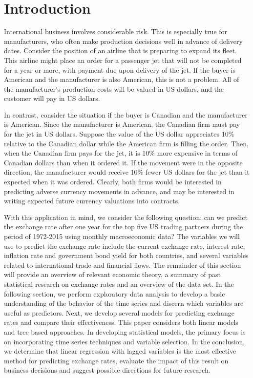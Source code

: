 \documentclass{sig-alternate-05-2015}
\begin{document}
\section{Introduction}
International business involves considerable risk. This is especially true for manufacturers, who often make production decisions well in advance of delivery dates. Consider the position of an airline that is preparing to expand its fleet. This airline might place an order for a passenger jet that will not be completed for a year or more, with payment due upon delivery of the jet. If the buyer is American and the manufacturer is also American, this is not a problem. All of the manufacturer's production costs will be valued in US dollars, and the customer will pay in US dollars.
\par{} In contrast, consider the situation if the buyer is Canadian and the manufacturer is American. Since the manufacturer is American, the Canadian firm must pay for the jet in US dollars. Suppose the value of the US dollar appreciates 10\% relative to the Canadian dollar while the American firm is filling the order. Then, when the Canadian firm pays for the jet, it is 10\% more expensive in terms of Canadian dollars than when it ordered it. If the movement were in the opposite direction, the manufacturer would receive 10\% fewer US dollars for the jet than it expected when it was ordered. Clearly, both firms would be interested in predicting adverse currency movements in advance, and may be interested in writing expected future currency valuations into contracts. 
\par{} With this application in mind, we consider the following question: can we predict the exchange rate after one year for the top five US trading partners during the period of 1972-2015 using monthly macroeconomic data? The variables we will use to predict the exchange rate include the current exchange rate, interest rate, inflation rate and government bond yield for both countries, and several variables related to international trade and financial flows. The remainder of this section will provide an overview of relevant economic theory, a summary of past statistical research on exchange rates and an overview of the data set. In the following section, we perform exploratory data analysis to develop a basic understanding of the behavior of the time series and discern which variables are useful as predictors. Next, we develop several models for predicting exchange rates and compare their effectiveness. This paper considers both linear models and tree based approaches. In developing statistical models, the primary focus is on incorporating time series techniques and variable selection. In the conclusion, we determine that linear regression with lagged variables is the most effective method for predicting exchange rates, evaluate the impact of this result on business decisions and suggest possible directions for future research.
\end{document}

